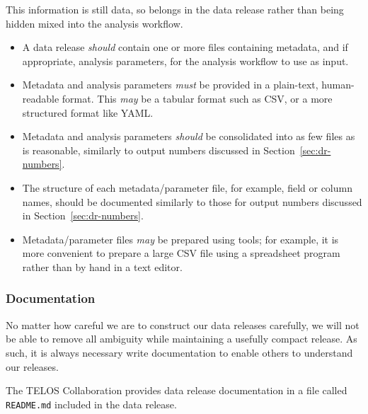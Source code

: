 \documentclass{article}
\newcommand\rfcword[1]{\emph{#1}\xspace}
\newcommand\must{\rfcword{must}}
\newcommand\should{\rfcword{should}}
\newcommand\may{\rfcword{may}}
\newcommand\filename[1]{\texttt{#1}\xspace}
\begin{document}
This information is still data,
so belongs in the data release rather than being hidden mixed into the analysis workflow.

\begin{itemize}
  \item
        A data release \should contain one or more files containing metadata,
        and if appropriate,
        analysis parameters,
        for the analysis workflow to use as input.
  \item
        Metadata and analysis parameters \must be provided in a plain-text,
        human-readable format.
        This \may be a tabular format such as CSV,
        or a more structured format like YAML\@.
  \item
        Metadata and analysis parameters \should be consolidated into as few files as is reasonable,
        similarly to output numbers discussed in Section~\ref{sec:dr-numbers}.
  \item
        The structure of each metadata/parameter file,
        for example,
        field or column names,
        should be documented similarly to those for output numbers
        discussed in Section~\ref{sec:dr-numbers}.
  \item
        Metadata/parameter files \may be prepared using tools;
        for example,
        it is more convenient to prepare a large CSV file using a spreadsheet program
        rather than by hand in a text editor.
\end{itemize}


\subsubsection{Documentation}\label{sec:dr-documentation}

No matter how careful we are to construct our data releases carefully,
we will not be able to remove all ambiguity while maintaining a usefully compact release.
As such,
it is always necessary write documentation to enable others to understand our releases.

The TELOS Collaboration provides data release documentation in a file called \filename{README.md}
included in the data release.
\end{document}
